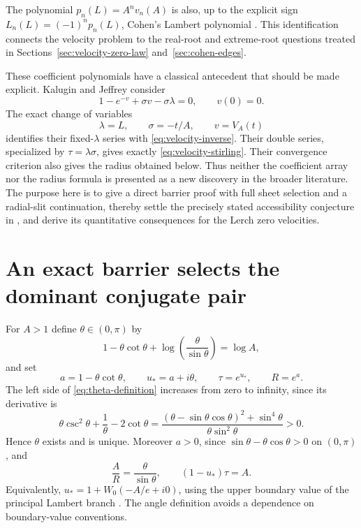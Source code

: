 \documentclass[11pt]{article}
\numberwithin{equation}{section}
\theoremstyle{definition}
\theoremstyle{remark}
\begin{document}
The polynomial $p_n(L)=A^n v_n(A)$ is also, up to the explicit sign
$L_n(L)=(-1)^n p_n(L)$, Cohen's Lambert polynomial
\cite[Proposition~4.8]{Cohen2021}.  This identification connects the
velocity problem to the real-root and extreme-root questions treated
in Sections~\ref{sec:velocity-zero-law} and~\ref{sec:cohen-edges}.

These coefficient polynomials have a classical antecedent that should be
made explicit.  Kalugin and Jeffrey \cite[\S2.1, Theorem~1]{KaluginJeffrey2012}
consider
\[
 1-e^{-v}+\sigma v-\sigma\lambda=0,\qquad v(0)=0.
\]
The exact change of variables
\begin{equation}\label{eq:classical-variable-map}
 \lambda=L,\qquad \sigma=-t/A,\qquad v=V_A(t)
\end{equation}
identifies their fixed-$\lambda$ series with \eqref{eq:velocity-inverse}.
Their double series, specialized by $\tau=\lambda\sigma$, gives exactly
\eqref{eq:velocity-stirling}.  Their convergence criterion also gives the
radius obtained below.  Thus neither the coefficient array nor the
radius formula is presented as a new discovery in the broader literature.
The purpose here is to give a direct barrier proof with full sheet
selection and a radial-slit continuation, thereby settle the precisely
stated accessibility conjecture in \cite{HarmonicBaseline}, and derive
its quantitative consequences for the Lerch zero velocities.

\section{An exact barrier selects the dominant conjugate pair}
\label{sec:dominant-pair}

For $A>1$ define $\theta\in(0,\pi)$ by
\begin{equation}\label{eq:theta-definition}
 1-\theta\cot\theta+
       \log\left(\frac{\theta}{\sin\theta}\right)=\log A,
\end{equation}
and set
\begin{equation}\label{eq:critical-parameters}
 a=1-\theta\cot\theta,\qquad u_*=a+i\theta,\qquad
 \tau=e^{u_*},\qquad R=e^a.
\end{equation}
The left side of \eqref{eq:theta-definition} increases from zero to
infinity, since its derivative is
\[
 \theta\csc^2\theta+\frac1\theta-2\cot\theta
 =\frac{(\theta-\sin\theta\cos\theta)^2+\sin^4\theta}
        {\theta\sin^2\theta}>0.
\]
Hence $\theta$ exists and is unique.  Moreover $a>0$, since
$\sin\theta-\theta\cos\theta>0$ on $(0,\pi)$, and
\begin{equation}\label{eq:critical-relations}
 \frac AR=\frac{\theta}{\sin\theta},\qquad
 (1-u_*)\tau=A.
\end{equation}
Equivalently, $u_*=1+W_0(-A/e+i0)$, using the upper boundary value of
the principal Lambert branch \cite{DLMFLambert}.  The angle definition
avoids a dependence on boundary-value conventions.
\end{document}
